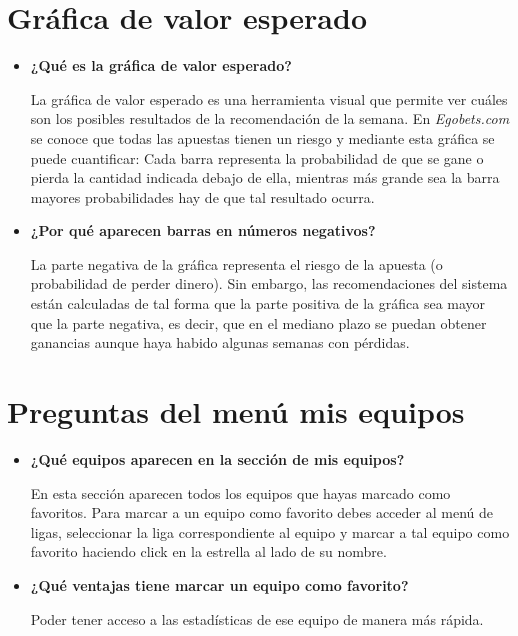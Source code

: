 \section{Gráfica de valor esperado}
\begin{itemize}
\item \textbf{¿Qué es la gráfica de valor esperado?}


La gráfica de valor esperado es una herramienta visual que permite ver cuáles son los posibles resultados de la recomendación de la semana. En \emph{Egobets.com} se conoce que todas las apuestas tienen un riesgo y mediante esta gráfica se puede cuantificar: Cada barra representa la probabilidad de que se gane o pierda la cantidad indicada debajo de ella, mientras más grande sea la barra mayores probabilidades hay de que tal resultado ocurra.

\item \textbf{¿Por qué aparecen barras en números negativos?}


La parte negativa de la gráfica representa el riesgo de la apuesta (o probabilidad de perder dinero). Sin embargo, las recomendaciones del sistema están calculadas de tal forma que la parte positiva de la gráfica sea mayor que la parte negativa, es decir, que en el mediano plazo se puedan obtener ganancias aunque haya habido algunas semanas con pérdidas.

\end{itemize}

\section{Preguntas del menú mis equipos}
\begin{itemize}

\item \textbf{¿Qué equipos aparecen en la sección de mis equipos?}


En esta sección aparecen todos los equipos que hayas marcado como favoritos. Para marcar a un equipo como favorito debes acceder al menú de ligas, seleccionar la liga correspondiente al equipo y marcar a tal equipo como favorito haciendo click en la estrella al lado de su nombre.

\item \textbf{¿Qué ventajas tiene marcar un equipo como favorito?}


Poder tener acceso a las estadísticas de ese equipo de manera más rápida.
\end{itemize}

